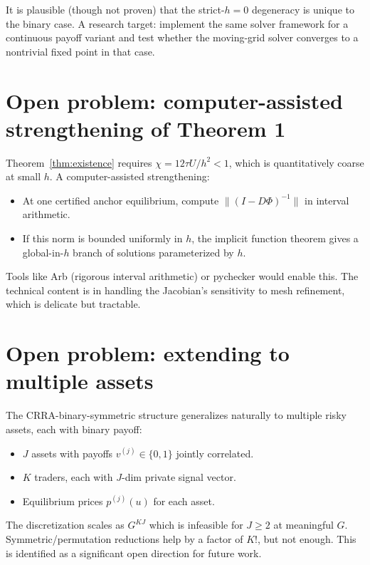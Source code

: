 \documentclass[11pt]{article}
\newcommand{\1}{\mathbf{1}}
\begin{document}
It is plausible (though not proven) that the strict-$h=0$ degeneracy
is unique to the binary case.  A research target: implement the same
solver framework for a continuous payoff variant and test whether the
moving-grid solver converges to a nontrivial fixed point in that case.

\section{Open problem: computer-assisted strengthening of Theorem 1}
\label{app:caps}

Theorem~\ref{thm:existence} requires $\chi = 12 \tau U / h^2 < 1$,
which is quantitatively coarse at small $h$.  A computer-assisted
strengthening:

\begin{itemize}
\item At one certified anchor equilibrium, compute $\|(I - D\Phi)^{-1}\|$
in interval arithmetic.
\item If this norm is bounded uniformly in $h$, the implicit function
theorem gives a global-in-$h$ branch of solutions parameterized by $h$.
\end{itemize}

Tools like Arb (rigorous interval arithmetic) or pychecker would
enable this.  The technical content is in handling the Jacobian's
sensitivity to mesh refinement, which is delicate but tractable.

\section{Open problem: extending to multiple assets}

The CRRA-binary-symmetric structure generalizes naturally to multiple
risky assets, each with binary payoff:

\begin{itemize}
\item $J$ assets with payoffs $v^{(j)} \in \{0, 1\}$ jointly correlated.
\item $K$ traders, each with $J$-dim private signal vector.
\item Equilibrium prices $p^{(j)}(u)$ for each asset.
\end{itemize}

The discretization scales as $G^{KJ}$ which is infeasible for $J \ge 2$
at meaningful $G$.  Symmetric/permutation reductions help by a factor
of $K!$, but not enough.  This is identified as a significant open
direction for future work.
\end{document}
